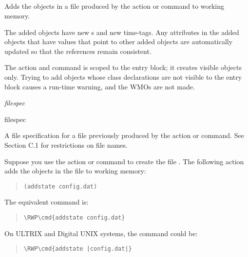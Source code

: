 \subsection{}

Adds the objects in a file produced by the  action or
command to working memory.

The added objects have new s and new time-tags. Any
attributes in the added objects that have  values that
point to other added objects are automatically updated so that the
references remain consistent.

The  action and command is scoped to the entry block; it
creates visible objects only. Trying to add objects whose class
declarations are not visible to the entry block causes a run-time
warning, and the WMOs are not made.

\Format

 \it{filespec}

\begin{arguments}
\item[filespec]

  A file specification for a file previously produced by the
   action or command. See Section C.1 for restrictions
  on file names.
\end{arguments}

\Example

Suppose you use the  action or command to create the
file . The following action adds the objects in the
file to working memory:

\begin{quote}
\begin{verbatim}
(addstate config.dat)
\end{verbatim}
\end{quote}

The equivalent command is:
\begin{quote}
\begin{Verbatim}[commandchars=\\\{\}]
\RWP\cmd{addstate config.dat}
\end{Verbatim}
\end{quote}

On ULTRIX and Digital UNIX systems, the command could be:

\begin{quote}
\begin{Verbatim}[commandchars=\\\{\}]
\RWP\cmd{addstate |config.dat|}
\end{Verbatim}
\end{quote}

